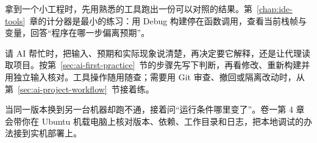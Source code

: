 拿到一个小工程时，先用熟悉的工具跑出一份可以对照的结果。第~\ref{chap:ide-tools}~章的计分器是最小的练习：用 Debug 构建停在函数调用，查看当前栈帧与变量，回答“程序在哪一步偏离预期”。

请 AI 帮忙时，把输入、预期和实际现象说清楚，再决定要它解释，还是让代理读取项目。按第~\ref{sec:ai-first-practice}~节的步骤先写下判断，再看修改、重新构建并用独立输入核对。工具操作随用随查；需要用 Git 审查、撤回或隔离改动时，从第~\ref{sec:ai-project-workflow}~节接着练。

当同一版本换到另一台机器却跑不通，接着问“运行条件哪里变了”。卷一第 4 章会带你在 Ubuntu 机载电脑上核对版本、依赖、工作目录和日志，把本地调试的办法接到实机部署上。
